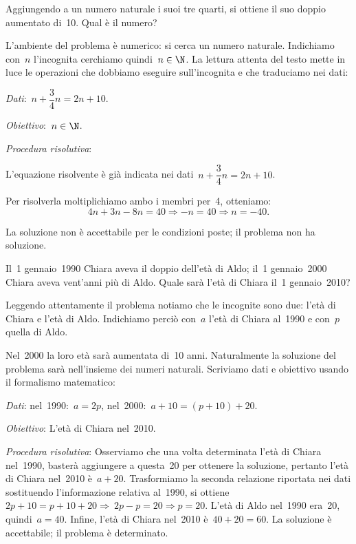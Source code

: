 \begin{problema}{}{}
Aggiungendo a un numero naturale i suoi tre quarti, si ottiene il suo
doppio aumentato di~10. Qual è il numero?
\end{problema}

\begin{soluzione}
L'ambiente del problema è numerico: si cerca un numero
naturale. Indichiamo con~\(n\) l'incognita
cerchiamo quindi~\(n\in\N\). La lettura attenta del testo mette
in luce le operazioni che dobbiamo eseguire
sull'incognita e che traduciamo nei dati:

\emph{Dati}:~\(n+\dfrac{3}{4}n=2n+10\).

\emph{Obiettivo}:~\(n\in\N\).

\emph{Procedura risolutiva}:

L'equazione risolvente è già indicata nei dati~\(n+\dfrac{3}{4}n=2n+10\).

Per risolverla moltiplichiamo ambo i membri per~4, otteniamo:
\[4n+3n-8n=40\Rightarrow -n=40\Rightarrow n=-40.\]

La soluzione non è accettabile per le condizioni poste; il problema
non ha soluzione.
\end{soluzione}

\begin{problema}{}{}
 Il~1{\textdegree} gennaio~1990 Chiara aveva il doppio
dell'età di Aldo; il~1{\textdegree} gennaio~2000
Chiara aveva vent'anni più di Aldo. Quale sarà
l'età di Chiara il~1{\textdegree} gennaio~2010?
\end{problema}

\begin{soluzione}
Leggendo attentamente il problema notiamo che le incognite sono due:
l'età di Chiara e l'età di Aldo.
Indichiamo perciò con~\(a\) l'età di
Chiara al~1990 e con~\(p\) quella di Aldo.

Nel~2000 la loro età sarà aumentata di~10 anni. Naturalmente la
soluzione del problema sarà nell'insieme dei numeri
naturali. Scriviamo dati e obiettivo usando il formalismo matematico:

\emph{Dati}: nel~1990:~\(a=2p\), nel~2000:~\(a+10=(p+10)+20\).

\emph{Obiettivo}: L'età di Chiara nel~2010.

\emph{Procedura risolutiva}:
Osserviamo che una volta determinata l'età di Chiara
nel~1990, basterà aggiungere a questa~20 per ottenere la soluzione,
pertanto l'età di Chiara nel~2010 è~\(a+20\).
Trasformiamo la seconda relazione riportata nei dati sostituendo
l'informazione relativa al~1990,
si ottiene~\(2p+10=p+10+20\Rightarrow~2p-p=20\Rightarrow p=20.\)
L'età di Aldo nel~1990 era~20, quindi~\(a=40\).
Infine, l'età di Chiara nel~2010 è~\(40+20=60\).
La soluzione è accettabile; il problema è determinato.
\end{soluzione}

